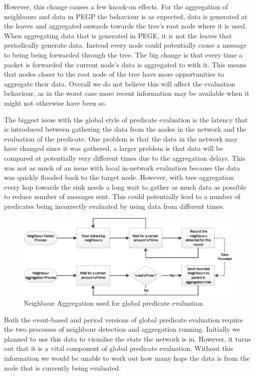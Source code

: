 However, this change causes a few knock-on effects. For the aggregation of neighbours and data in PEGP the behaviour is as expected, data is generated at the leaves and aggregated onwards towards the tree's root node where it is used. When aggregating data that is generated in PEGE, it is not the leaves that periodically generate data. Instead every node could potentially cause a message to being being forwarded through the tree. The big change is that every time a packet is forwarded the current node's data is aggregated to with it. This means that nodes closer to the root node of the tree have more opportunities to aggregate their data. Overall we do not believe this will affect the evaluation behaviour, as in the worst case more recent information may be available when it might not otherwise have been so.

The biggest issue with the global style of predicate evaluation is the latency that is introduced between gathering the data from the nodes in the network and the evaluation of the predicate. One problem is that the data in the network may have changed since it was gathered, a larger problem is that data will be compared at potentially very different times due to the aggregation delays. This was not as much of an issue with local in-network evaluation because the data was quickly flooded back to the target node. However, with tree aggregation every hop towards the sink needs a long wait to gather as much data as possible to reduce number of messages sent. This could potentially lead to a number of predicates being incorrectly evaluated by using data from different times.

\begin{figure}[H]
\centering
\includegraphics[width=\linewidth]{Diagrams/pegx-neighbour-agg.eps}
\caption{Neighbour Aggregation used for global predicate evaluation}
\end{figure}

Both the event-based and period versions of global predicate evaluation require the two processes of neighbour detection and aggregation running. Initially we planned to use this data to visualise the state the network is in. However, it turns out that it is a vital component of global predicate evaluation. Without this information we would be unable to work out how many hops  the data is from the node that is currently being evaluated.

